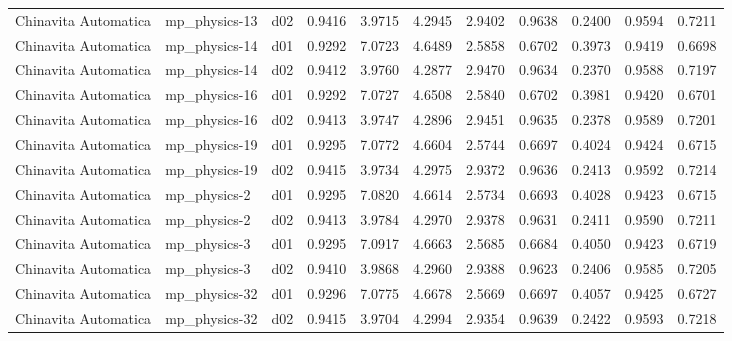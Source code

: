 \begin{longtable}{lllrrrrrrrr}
 Chinavita Automatica  &         mp\_physics-13 &     d02 &   0.9416 &   3.9715 &   4.2945 &       2.9402 &        0.9638 &       0.2400 &           0.9594 &  0.7211 \\
 Chinavita Automatica  &         mp\_physics-14 &     d01 &   0.9292 &   7.0723 &   4.6489 &       2.5858 &        0.6702 &       0.3973 &           0.9419 &  0.6698 \\
 Chinavita Automatica  &         mp\_physics-14 &     d02 &   0.9412 &   3.9760 &   4.2877 &       2.9470 &        0.9634 &       0.2370 &           0.9588 &  0.7197 \\
 Chinavita Automatica  &         mp\_physics-16 &     d01 &   0.9292 &   7.0727 &   4.6508 &       2.5840 &        0.6702 &       0.3981 &           0.9420 &  0.6701 \\
 Chinavita Automatica  &         mp\_physics-16 &     d02 &   0.9413 &   3.9747 &   4.2896 &       2.9451 &        0.9635 &       0.2378 &           0.9589 &  0.7201 \\
 Chinavita Automatica  &         mp\_physics-19 &     d01 &   0.9295 &   7.0772 &   4.6604 &       2.5744 &        0.6697 &       0.4024 &           0.9424 &  0.6715 \\
 Chinavita Automatica  &         mp\_physics-19 &     d02 &   0.9415 &   3.9734 &   4.2975 &       2.9372 &        0.9636 &       0.2413 &           0.9592 &  0.7214 \\
 Chinavita Automatica  &          mp\_physics-2 &     d01 &   0.9295 &   7.0820 &   4.6614 &       2.5734 &        0.6693 &       0.4028 &           0.9423 &  0.6715 \\
 Chinavita Automatica  &          mp\_physics-2 &     d02 &   0.9413 &   3.9784 &   4.2970 &       2.9378 &        0.9631 &       0.2411 &           0.9590 &  0.7211 \\
 Chinavita Automatica  &          mp\_physics-3 &     d01 &   0.9295 &   7.0917 &   4.6663 &       2.5685 &        0.6684 &       0.4050 &           0.9423 &  0.6719 \\
 Chinavita Automatica  &          mp\_physics-3 &     d02 &   0.9410 &   3.9868 &   4.2960 &       2.9388 &        0.9623 &       0.2406 &           0.9585 &  0.7205 \\
 Chinavita Automatica  &         mp\_physics-32 &     d01 &   0.9296 &   7.0775 &   4.6678 &       2.5669 &        0.6697 &       0.4057 &           0.9425 &  0.6727 \\
 Chinavita Automatica  &         mp\_physics-32 &     d02 &   0.9415 &   3.9704 &   4.2994 &       2.9354 &        0.9639 &       0.2422 &           0.9593 &  0.7218 \\

\end{longtable}
